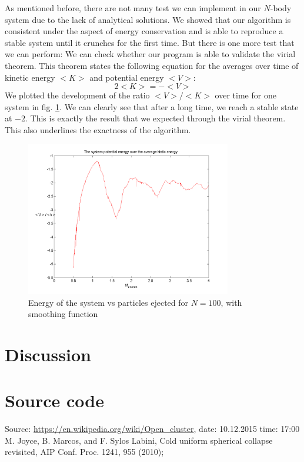 \documentclass[10pt,a4paper]{article}
\begin{document}
As mentioned before, there are not many test we can implement in our $N$-body system due to the lack of analytical solutions. We showed that our algorithm is consistent under the aspect of energy conservation and is able to reproduce a stable system until it crunches for the first time. But there is one more test that we can perform: We can check whether our program is able to validate the virial theorem. This theorem states the following equation for the averages over time of kinetic energy $<K>$ and potential energy $<V>$:
\begin{equation}
2<K>=-<V>
\end{equation}
We plotted the development of the ratio $<V>/<K>$ over time for one system in fig. \ref{f1}. We can clearly see that after a long time, we reach a stable state at $-2$. This is exactly the result that we expected through the virial theorem. This also underlines the exactness of the algorithm.

\begin{figure}[h]
	\caption{Energy of the system vs particles ejected for $N=100$, with smoothing function\label{f1}}
	\includegraphics[width=0.8\textwidth]{f1.png}
\end{figure}

\section{Discussion}

\section{Source code}

\begin{thebibliography}{mustermarke}
 Source: \url{https://en.wikipedia.org/wiki/Open_cluster}, date: 10.12.2015 time: 17:00
 M. Joyce, B. Marcos, and F. Sylos Labini, Cold uniform spherical collapse revisited,
AIP Conf. Proc. 1241, 955 (2010);
\end{thebibliography}
\end{document}

